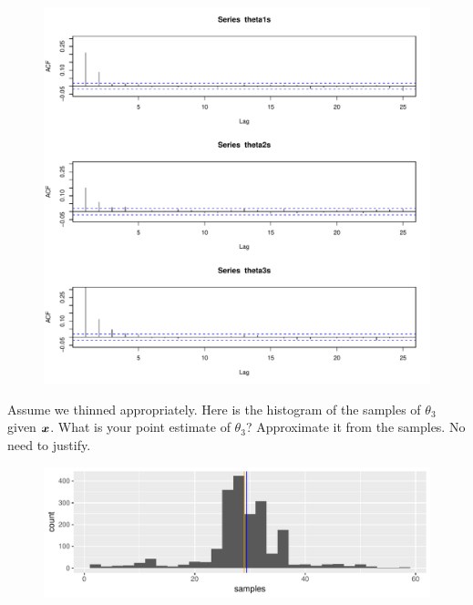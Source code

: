 \documentclass[12pt]{article}
\begin{document}
\begin{enumerate}[(a)]
\begin{figure}[h]
    \centering
    \includegraphics[width=7in]{autocorrelations.pdf}
    \label{fig:enter-label}
\end{figure}
\FloatBarrier




 Assume we thinned appropriately. Here is the histogram of the samples of $\theta_3$ given $\boldsymbol{x}$. What is your point estimate of $\theta_3$? Approximate it from the samples. No need to justify. 
%
\iftoggle{solutions}{\inred{
\beqn
29
\eeqn
}}{~\\~\\Your answer: }
%

\begin{figure}[h]
    \centering
    \includegraphics[width=5in]{theta3s.pdf}
    \label{fig:enter-label}
\end{figure}
\FloatBarrier


\end{enumerate}
\end{document}
